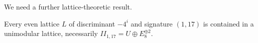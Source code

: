 \documentclass{article}
\newcommand{\adam}[1]{\textcolor{blue}{#1}}
\begin{document}
  

We need a further lattice-theoretic result.

\begin{prop}\label{prop:always-contained}
  Every even lattice $L$ of discriminant $-4^i$ and signature $(1,17)$ is
  contained in a unimodular lattice, necessarily $II_{1,17}=U \oplus E_8^{\oplus 2}$.  
\end{prop}

\end{document}

